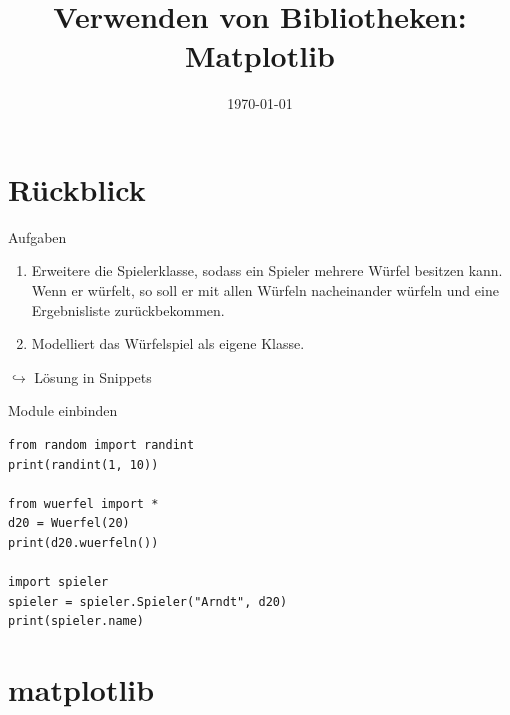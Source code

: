 



\title{Verwenden von Bibliotheken: Matplotlib}
\date{\today}




\maketitle

\section{Rückblick}

\begin{frame}{Aufgaben}
	\begin{enumerate}
		\item Erweitere die Spielerklasse, sodass ein Spieler mehrere Würfel besitzen kann. Wenn er würfelt, so soll er mit allen Würfeln nacheinander würfeln und eine Ergebnisliste zurückbekommen.
		\item Modelliert das Würfelspiel als eigene Klasse.
	\end{enumerate}
    $\hookrightarrow$ Lösung in Snippets
\end{frame}

\begin{frame}[fragile]{Module einbinden}
	\begin{lstlisting}
from random import randint
print(randint(1, 10))

from wuerfel import *
d20 = Wuerfel(20)
print(d20.wuerfeln())

import spieler
spieler = spieler.Spieler("Arndt", d20)
print(spieler.name)
	\end{lstlisting}
\end{frame}

\section{matplotlib}


